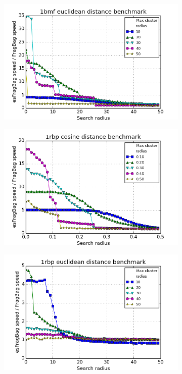 \documentclass[review,preprint,12pt]{elsarticle}
\theoremstyle{definition}
\theoremstyle{remark}
\numberwithin{equation}{section}
\begin{document}
\begin{figure}[tbp]
\begin{subfigure}[b]{0.38\textwidth}
    \end{subfigure}%
    \begin{subfigure}[b]{0.38\textwidth}
        \includegraphics[width=1\textwidth]{assets/1bmf_euclid.png}
    \end{subfigure}
    \begin{subfigure}[b]{0.38\textwidth}
        \includegraphics[width=1\textwidth]{assets/1rbp_cosine.png}
    \end{subfigure}%
    \begin{subfigure}[b]{0.38\textwidth}
        \includegraphics[width=1\textwidth]{assets/1rbp_euclid.png}

\end{subfigure}
\end{figure}
\end{document}
